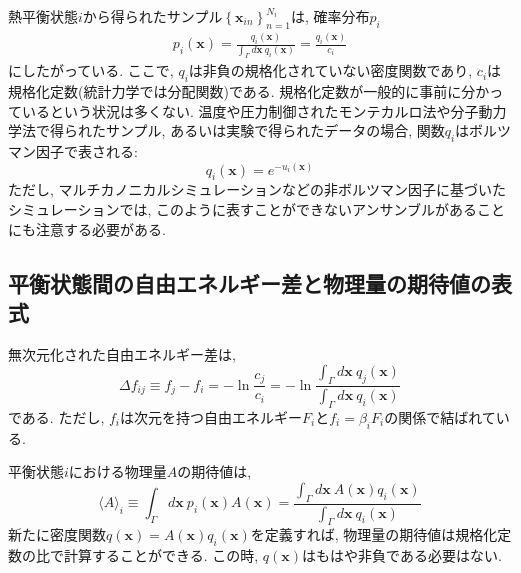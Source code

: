 熱平衡状態$i$から得られたサンプル$\left\{\bm{x}_{in}\right\}_{n=1}^{N_{i}}$は, 確率分布$p_{i}$
\begin{align}
    p_{i} (\bm{x}) =
    \frac{q_{i}(\bm{x})}{\int_{\Gamma} d\bm{x}~q_{i}(\bm{x})} =
    \frac{q_{i}(\bm{x})}{c_{i}}
\end{align}
にしたがっている. 
ここで, $q_{i}$は非負の規格化されていない密度関数であり, $c_{i}$は規格化定数(統計力学では分配関数)である. 規格化定数が一般的に事前に分かっているという状況は多くない. 
温度や圧力制御されたモンテカルロ法や分子動力学法で得られたサンプル, あるいは実験で得られたデータの場合, 関数$q_{i}$はボルツマン因子で表される:
\begin{equation}
    q_{i}(\bm{x}) = e^{-u_{i}(\bm{x})}
\end{equation}
ただし, マルチカノニカルシミュレーションなどの非ボルツマン因子に基づいたシミュレーションでは, このように表すことができないアンサンブルがあることにも注意する必要がある. 

\subsection{平衡状態間の自由エネルギー差と物理量の期待値の表式}
無次元化された自由エネルギー差は, 
\begin{equation}
    \Delta f_{ij} \equiv
    f_{j} - f_{i} =
    - \ln \frac{c_{j}}{c_{i}} =
    - \ln \frac{\int_{\Gamma} d\bm{x}~q_{j}(\bm{x})}{\int_{\Gamma} d\bm{x}~q_{i}(\bm{x})}
\end{equation}
である. ただし, $f_{i}$は次元を持つ自由エネルギー$F_{i}$と$f_{i} = \beta_{i} F_{i}$の関係で結ばれている. 

平衡状態$i$における物理量$A$の期待値は, 
\begin{equation}
    \langle A \rangle_{i} \equiv
    \int_{\Gamma} d\bm{x}~ p_{i}(\bm{x}) A(\bm{x}) =
    \frac{\int_{\Gamma} d\bm{x}~ A(\bm{x})q_{i}(\bm{x})}{\int_{\Gamma} d\bm{x}~ q_{i}(\bm{x})}
    \label{Eq:MBAR-Expectation-PhysVal}
\end{equation}
新たに密度関数$q(\bm{x})=A(\bm{x})q_{i}(\bm{x})$を定義すれば, 物理量の期待値は規格化定数の比で計算することができる. この時, $q(\bm{x})$はもはや非負である必要はない. 

